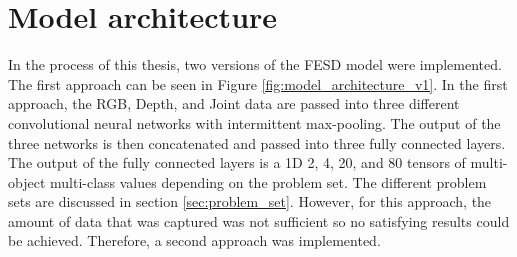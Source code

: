 \section{Model architecture}
\label{sec:model_architecture}

In the process of this thesis, two versions of the FESD model were implemented. The first approach can be seen in Figure \ref{fig:model_architecture_v1}. In the first approach, the RGB, Depth, and Joint data are passed into three different convolutional neural networks with intermittent max-pooling. The output of the three networks is then concatenated and passed into three fully connected layers. The output of the fully connected layers is a 1D 2, 4, 20, and 80 tensors of multi-object multi-class values depending on the problem set. The different problem sets are discussed in section \ref{sec:problem_set}. However, for this approach, the amount of data that was captured was not sufficient so no satisfying results could be achieved. Therefore, a second approach was implemented.

